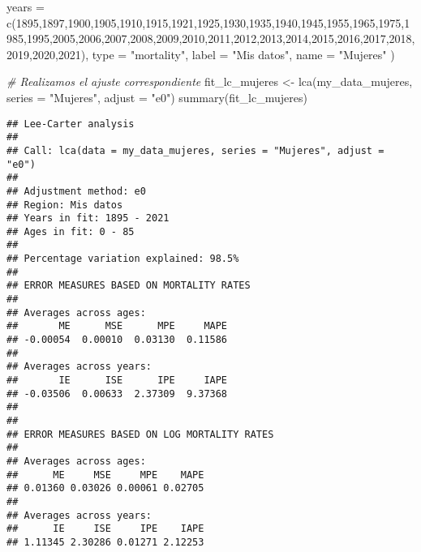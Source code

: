 \documentclass[
]{article}
\newenvironment{Shaded}{\begin{snugshade}}{\end{snugshade}}
\newcommand{\AttributeTok}[1]{\textcolor[rgb]{0.77,0.63,0.00}{#1}}
\newcommand{\CommentTok}[1]{\textcolor[rgb]{0.56,0.35,0.01}{\textit{#1}}}
\newcommand{\DecValTok}[1]{\textcolor[rgb]{0.00,0.00,0.81}{#1}}
\newcommand{\FunctionTok}[1]{\textcolor[rgb]{0.00,0.00,0.00}{#1}}
\newcommand{\NormalTok}[1]{#1}
\newcommand{\OtherTok}[1]{\textcolor[rgb]{0.56,0.35,0.01}{#1}}
\newcommand{\StringTok}[1]{\textcolor[rgb]{0.31,0.60,0.02}{#1}}
\begin{document}
\begin{Shaded}
\begin{Highlighting}[]
  \AttributeTok{years =} \FunctionTok{c}\NormalTok{(}\DecValTok{1895}\NormalTok{,}\DecValTok{1897}\NormalTok{,}\DecValTok{1900}\NormalTok{,}\DecValTok{1905}\NormalTok{,}\DecValTok{1910}\NormalTok{,}\DecValTok{1915}\NormalTok{,}\DecValTok{1921}\NormalTok{,}\DecValTok{1925}\NormalTok{,}\DecValTok{1930}\NormalTok{,}\DecValTok{1935}\NormalTok{,}\DecValTok{1940}\NormalTok{,}\DecValTok{1945}\NormalTok{,}\DecValTok{1955}\NormalTok{,}\DecValTok{1965}\NormalTok{,}\DecValTok{1975}\NormalTok{,}\DecValTok{1985}\NormalTok{,}\DecValTok{1995}\NormalTok{,}\DecValTok{2005}\NormalTok{,}\DecValTok{2006}\NormalTok{,}\DecValTok{2007}\NormalTok{,}\DecValTok{2008}\NormalTok{,}\DecValTok{2009}\NormalTok{,}\DecValTok{2010}\NormalTok{,}\DecValTok{2011}\NormalTok{,}\DecValTok{2012}\NormalTok{,}\DecValTok{2013}\NormalTok{,}\DecValTok{2014}\NormalTok{,}\DecValTok{2015}\NormalTok{,}\DecValTok{2016}\NormalTok{,}\DecValTok{2017}\NormalTok{,}\DecValTok{2018}\NormalTok{,}\DecValTok{2019}\NormalTok{,}\DecValTok{2020}\NormalTok{,}\DecValTok{2021}\NormalTok{),   }
  \AttributeTok{type =} \StringTok{"mortality"}\NormalTok{, }
  \AttributeTok{label =} \StringTok{"Mis datos"}\NormalTok{,}
  \AttributeTok{name =} \StringTok{"Mujeres"}
\NormalTok{)}

\CommentTok{\# Realizamos el ajuste correspondiente}
\NormalTok{fit\_lc\_mujeres }\OtherTok{\textless{}{-}} \FunctionTok{lca}\NormalTok{(my\_data\_mujeres, }\AttributeTok{series =} \StringTok{"Mujeres"}\NormalTok{, }\AttributeTok{adjust =} \StringTok{"e0"}\NormalTok{)}
\FunctionTok{summary}\NormalTok{(fit\_lc\_mujeres)}
\end{Highlighting}
\end{Shaded}

\begin{verbatim}
## Lee-Carter analysis
## 
## Call: lca(data = my_data_mujeres, series = "Mujeres", adjust = "e0") 
## 
## Adjustment method: e0
## Region: Mis datos
## Years in fit: 1895 - 2021
## Ages in fit: 0 - 85 
## 
## Percentage variation explained: 98.5%
## 
## ERROR MEASURES BASED ON MORTALITY RATES
## 
## Averages across ages:
##       ME      MSE      MPE     MAPE 
## -0.00054  0.00010  0.03130  0.11586 
## 
## Averages across years:
##       IE      ISE      IPE     IAPE 
## -0.03506  0.00633  2.37309  9.37368 
## 
## 
## ERROR MEASURES BASED ON LOG MORTALITY RATES
## 
## Averages across ages:
##      ME     MSE     MPE    MAPE 
## 0.01360 0.03026 0.00061 0.02705 
## 
## Averages across years:
##      IE     ISE     IPE    IAPE 
## 1.11345 2.30286 0.01271 2.12253
\end{verbatim}
\end{document}
